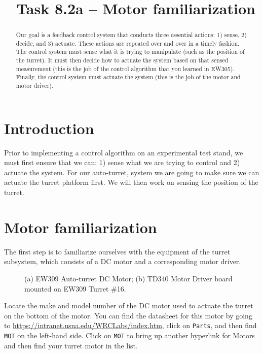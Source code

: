 \documentclass{exam}
\title{\usnaCourseNumber\ Task 8.2a -- Motor familiarization}
\author{\usnaInstructorShort}
\date{\printdate{\courseWeekSeven}}
\begin{document}
\maketitle

\begin{abstract}
Our goal is a feedback control system that conducts three essential actions: 1) sense, 2) decide, and 3) actuate. These actions are repeated over and over in a timely fashion. The control system must sense what it is trying to manipulate (such as the position of the turret). It must then decide how to actuate the system based on that sensed measurement (this is the job of the control algorithm that you learned in EW305). Finally, the control system must actuate the system (this is the job of the motor and motor driver). 
\end{abstract}


\section{Introduction}
Prior to implementing a control algorithm on an experimental test stand, we must first ensure that we can: 1) sense what we are trying to control and 2) actuate the system.  For our auto-turret, system we are going to make sure we can actuate the turret platform first. We will then work on sensing the position of the turret.






\section{Motor familiarization}
The first step is to familiarize ourselves with the equipment of the turret subsystem, which consists of a DC motor and a corresponding motor driver.                   
\begin{figure}[h]
\caption{(a) EW309 Auto-turret DC Motor; (b) TD340 Motor Driver board mounted on EW309 Turret \#16.}
\label{fig:1}
\end{figure}

Locate the make and model number of the DC motor used to actuate the turret on the bottom of the motor.  You can find the datasheet for this motor by going to \url{https://intranet.usna.edu/WRCLabs/index.htm}, click on \lstinline{Parts}, and then find \lstinline{MOT} on the left-hand side.  Click on \lstinline{MOT} to bring up another hyperlink for Motors and then find your turret motor in the list. 
\end{document}

